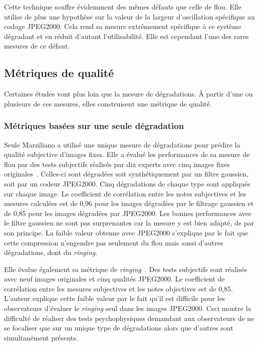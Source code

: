 Cette technique souffre évidemment des mêmes défauts que celle de flou. Elle utilise de plus une hypothèse sur la valeur de la largeur d'oscillation spécifique au codage JPEG2000. Cela rend sa mesure extrêmement spécifique à ce système dégradant et en réduit d'autant l'utilisabilité. Elle est cependant l'une des rares mesures de ce défaut.


\subsection{Métriques de qualité}
Certaines études vont plus loin que la mesure de dégradations. À partir d'une ou plusieurs de ces mesures, elles construisent une métrique de qualité. %


\subsubsection{Métriques basées sur une seule dégradation}
Seule Marziliano a utilisé une unique mesure de dégradations pour prédire la qualité subjective d'images fixes. Elle a évalué les performances de sa mesure de flou par des tests subjectifs réalisés par dix experts avec cinq images fixes originales~\cite{marziliano-blurmetric}. Celles-ci sont dégradées soit synthétiquement par un filtre gaussien, soit par un codeur JPEG2000. Cinq dégradations de chaque type sont appliqués sur chaque image. Le coefficient de corrélation entre les notes subjectives et les mesures calculées est de 0,96 pour les images dégradées par le filtrage gaussien et de 0,85 pour les images dégradées par JPEG2000. Les bonnes performances avec le filtre gaussien ne sont pas surprenantes car la mesure y est bien adapté, de par son principe. La faible valeur obtenue avec JPEG2000 s'explique par le fait que cette compression n'engendre pas seulement du flou mais aussi d'autres dégradations, dont du \emph{ringing}.

Elle évalue également sa métrique de \emph{ringing}~\cite{marziliano-ringingmetric}. Des tests subjectifs sont réalisés avec neuf images originales et cinq qualités JPEG2000. Le coefficient de corrélation entre les mesures subjectives et les notes objectives est de 0,85. L'auteur explique cette faible valeur par le fait qu'il est difficile pour les observateurs d'évaluer le \emph{ringing} seul dans les images JPEG2000. Ceci montre la difficulté de réaliser des tests psychophysiques demandant aux observateurs de ne se focaliser que sur un unique type de dégradations alors que d'autres sont simultanément présents.


